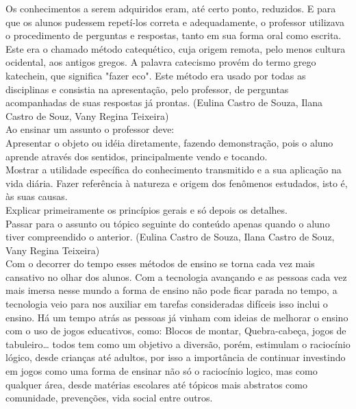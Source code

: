 \documentclass[12pt]{article}
\begin{document}
	Os conhecimentos a serem adquiridos eram, até certo ponto, reduzidos. E para que os alunos pudessem repetí-los correta e adequadamente, o professor utilizava o procedimento de perguntas e respostas, tanto em sua forma oral como escrita. Este era o chamado método catequético, cuja origem remota, pelo menos cultura ocidental, aos antigos gregos. A palavra catecismo provém do termo grego katechein, que significa "fazer eco". Este método era usado por todas as disciplinas e consistia na apresentação, pelo professor, de perguntas acompanhadas de suas respostas já prontas. (Eulina Castro de Souza, Ilana Castro de Souz, Vany Regina Teixeira)\\
	
	Ao ensinar um assunto o professor deve:\\
	
	Apresentar o objeto ou idéia diretamente, fazendo demonstração, pois o aluno aprende através dos sentidos, principalmente vendo e tocando.\\
	
	Mostrar a utilidade específica do conhecimento transmitido e a sua aplicação na vida diária.
	Fazer referência à natureza e origem dos fenômenos estudados, isto é, às suas causas.\\
	
	Explicar primeiramente os princípios gerais e só depois os detalhes.\\
	
	Passar para o assunto ou tópico seguinte do conteúdo apenas quando o aluno tiver compreendido o anterior. (Eulina Castro de Souza, Ilana Castro de Souz, Vany Regina Teixeira)\\
	
	Com o decorrer do tempo esses métodos de ensino se torna cada vez mais cansativo no olhar dos alunos. Com a tecnologia avançando e as pessoas cada vez mais imersa nesse mundo a forma de ensino não pode ficar parada no tempo, a tecnologia veio para nos auxiliar em tarefas consideradas difíceis isso inclui o ensino. Há um tempo atrás as pessoas já vinham com ideias de melhorar o ensino com o uso de jogos educativos, como: Blocos de montar, Quebra-cabeça, jogos de tabuleiro… todos tem como um objetivo a diversão, porém, estimulam o raciocínio lógico, desde crianças até adultos, por isso a importância de continuar investindo em jogos como uma forma de ensinar não só o raciocínio logico, mas como qualquer área, desde matérias escolares até tópicos mais abstratos como comunidade, prevenções, vida social entre outros.
	
\end{document}
